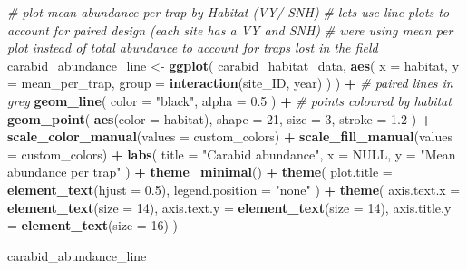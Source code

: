 \documentclass[
]{article}
\newenvironment{Shaded}{\begin{snugshade}}{\end{snugshade}}
\newcommand{\AttributeTok}[1]{\textcolor[rgb]{0.13,0.29,0.53}{#1}}
\newcommand{\CommentTok}[1]{\textcolor[rgb]{0.56,0.35,0.01}{\textit{#1}}}
\newcommand{\ConstantTok}[1]{\textcolor[rgb]{0.56,0.35,0.01}{#1}}
\newcommand{\DecValTok}[1]{\textcolor[rgb]{0.00,0.00,0.81}{#1}}
\newcommand{\FloatTok}[1]{\textcolor[rgb]{0.00,0.00,0.81}{#1}}
\newcommand{\FunctionTok}[1]{\textcolor[rgb]{0.13,0.29,0.53}{\textbf{#1}}}
\newcommand{\NormalTok}[1]{#1}
\newcommand{\OtherTok}[1]{\textcolor[rgb]{0.56,0.35,0.01}{#1}}
\newcommand{\SpecialCharTok}[1]{\textcolor[rgb]{0.81,0.36,0.00}{\textbf{#1}}}
\newcommand{\StringTok}[1]{\textcolor[rgb]{0.31,0.60,0.02}{#1}}
\begin{document}
\begin{Shaded}
\begin{Highlighting}[]
\CommentTok{\# plot mean abundance per trap by Habitat (VY/ SNH)}
\CommentTok{\# lets use line plots to account for paired design (each site has a VY and SNH)}
\CommentTok{\# we\textquotesingle{}re using mean per plot instead of total abundance to account for traps lost in the field}
\NormalTok{carabid\_abundance\_line }\OtherTok{\textless{}{-}} \FunctionTok{ggplot}\NormalTok{(}
\NormalTok{  carabid\_habitat\_data,}
  \FunctionTok{aes}\NormalTok{(}
    \AttributeTok{x =}\NormalTok{ habitat,}
    \AttributeTok{y =}\NormalTok{ mean\_per\_trap,}
    \AttributeTok{group =} \FunctionTok{interaction}\NormalTok{(site\_ID, year)}
\NormalTok{  )}
\NormalTok{) }\SpecialCharTok{+}
  \CommentTok{\# paired lines in grey}
  \FunctionTok{geom\_line}\NormalTok{(}
    \AttributeTok{color =} \StringTok{"black"}\NormalTok{,}
    \AttributeTok{alpha =} \FloatTok{0.5}
\NormalTok{  ) }\SpecialCharTok{+}
  \CommentTok{\# points coloured by habitat}
  \FunctionTok{geom\_point}\NormalTok{(}
    \FunctionTok{aes}\NormalTok{(}\AttributeTok{color =}\NormalTok{ habitat),}
    \AttributeTok{shape =} \DecValTok{21}\NormalTok{,}
    \AttributeTok{size =} \DecValTok{3}\NormalTok{,}
    \AttributeTok{stroke =} \FloatTok{1.2}
\NormalTok{  ) }\SpecialCharTok{+}
  \FunctionTok{scale\_color\_manual}\NormalTok{(}\AttributeTok{values =}\NormalTok{ custom\_colors) }\SpecialCharTok{+}
  \FunctionTok{scale\_fill\_manual}\NormalTok{(}\AttributeTok{values =}\NormalTok{ custom\_colors) }\SpecialCharTok{+}
  \FunctionTok{labs}\NormalTok{(}
    \AttributeTok{title =} \StringTok{"Carabid abundance"}\NormalTok{,}
    \AttributeTok{x =} \ConstantTok{NULL}\NormalTok{,}
    \AttributeTok{y =} \StringTok{"Mean abundance per trap"}
\NormalTok{  ) }\SpecialCharTok{+}
  \FunctionTok{theme\_minimal}\NormalTok{() }\SpecialCharTok{+}
  \FunctionTok{theme}\NormalTok{(}
    \AttributeTok{plot.title =} \FunctionTok{element\_text}\NormalTok{(}\AttributeTok{hjust =} \FloatTok{0.5}\NormalTok{),}
    \AttributeTok{legend.position =} \StringTok{"none"}
\NormalTok{  ) }\SpecialCharTok{+} \FunctionTok{theme}\NormalTok{(}
  \AttributeTok{axis.text.x  =} \FunctionTok{element\_text}\NormalTok{(}\AttributeTok{size =} \DecValTok{14}\NormalTok{),}
  \AttributeTok{axis.text.y  =} \FunctionTok{element\_text}\NormalTok{(}\AttributeTok{size =} \DecValTok{14}\NormalTok{),}
  \AttributeTok{axis.title.y =} \FunctionTok{element\_text}\NormalTok{(}\AttributeTok{size =} \DecValTok{16}\NormalTok{)}
\NormalTok{)}


\NormalTok{carabid\_abundance\_line}
\end{Highlighting}
\end{Shaded}
\end{document}
